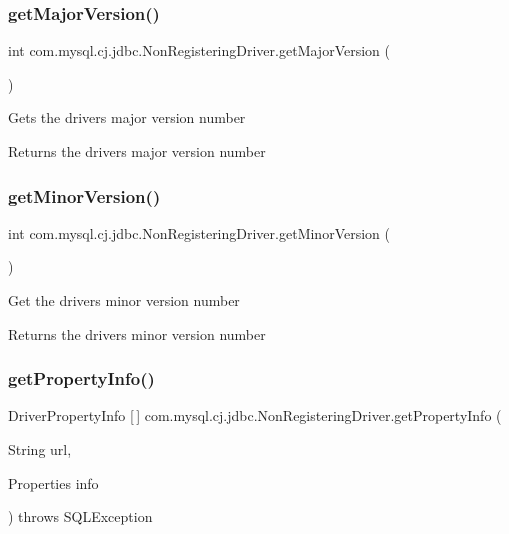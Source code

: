 \subsubsection{\texorpdfstring{get\+Major\+Version()}{getMajorVersion()}}
{\footnotesize\ttfamily int com.\+mysql.\+cj.\+jdbc.\+Non\+Registering\+Driver.\+get\+Major\+Version (\begin{DoxyParamCaption}{ }\end{DoxyParamCaption})}

Gets the drivers major version number

\begin{DoxyReturn}{Returns}
the drivers major version number 
\end{DoxyReturn}
\mbox{\label{classcom_1_1mysql_1_1cj_1_1jdbc_1_1_non_registering_driver_a004f3e6c14f4cecb91e1d10cb87f873f}} 
\subsubsection{\texorpdfstring{get\+Minor\+Version()}{getMinorVersion()}}
{\footnotesize\ttfamily int com.\+mysql.\+cj.\+jdbc.\+Non\+Registering\+Driver.\+get\+Minor\+Version (\begin{DoxyParamCaption}{ }\end{DoxyParamCaption})}

Get the drivers minor version number

\begin{DoxyReturn}{Returns}
the drivers minor version number 
\end{DoxyReturn}
\mbox{\label{classcom_1_1mysql_1_1cj_1_1jdbc_1_1_non_registering_driver_ad132531e673998633349a65c4c3eb402}} 
\subsubsection{\texorpdfstring{get\+Property\+Info()}{getPropertyInfo()}}
{\footnotesize\ttfamily Driver\+Property\+Info \mbox{[}$\,$\mbox{]} com.\+mysql.\+cj.\+jdbc.\+Non\+Registering\+Driver.\+get\+Property\+Info (\begin{DoxyParamCaption}\item[{String}]{url,  }\item[{Properties}]{info }\end{DoxyParamCaption}) throws S\+Q\+L\+Exception}

